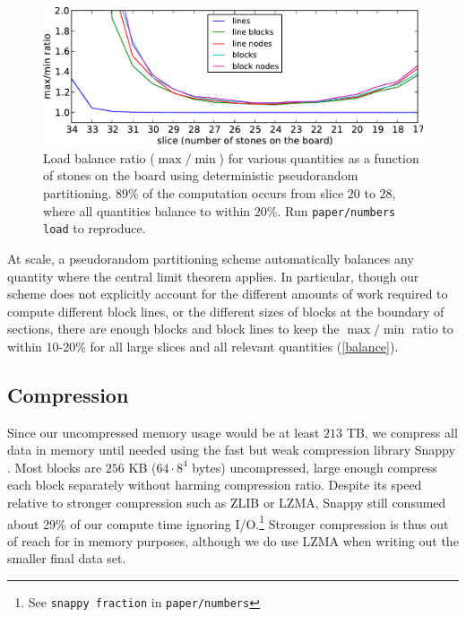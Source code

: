 \documentclass[conference]{IEEEtran}
\begin{document}
\begin{figure}
\begin{center}
\includegraphics[width=\columnwidth]{balance.pdf}
\end{center}
\vspace{-.1in}
\cprotect\caption{Load balance ratio ($\max/\min$) for various quantities as a function of stones on the board using
deterministic pseudorandom partitioning.  89\% of the computation occurs from slice $20$ to $28$, where
all quantities balance to within 20\%.  Run \verb+paper/numbers load+ to reproduce.}
\label{balance}
\end{figure}

At scale, a pseudorandom partitioning scheme automatically balances any quantity where the central limit
theorem applies.  In particular, though our scheme does not explicitly account for the different amounts of
work required to compute different block lines, or the different sizes of blocks at the boundary of sections,
there are enough blocks and block lines to keep the $\max/\min$ ratio to within 10-20\% for all large slices and
all relevant quantities (\autoref{balance}).

\subsection{Compression}

Since our uncompressed memory usage would be at least $213$ TB, we compress all data in memory until needed
using the fast but weak compression library Snappy \cite{snappy2014}.  Most blocks are $256$ KB
($64 \cdot 8^4$ bytes) uncompressed, large enough compress each block separately without harming compression ratio.
Despite its speed relative to stronger compression such as ZLIB or LZMA\cite{deutsch1996zlib,xz2014}, Snappy still consumed about 29\% of our
compute time ignoring I/O.\cprotect\footnote{See \verb+snappy fraction+ in \verb+paper/numbers+}  Stronger
compression is thus out of reach for in memory purposes, although we do use LZMA when writing
out the smaller final data set.
\end{document}
